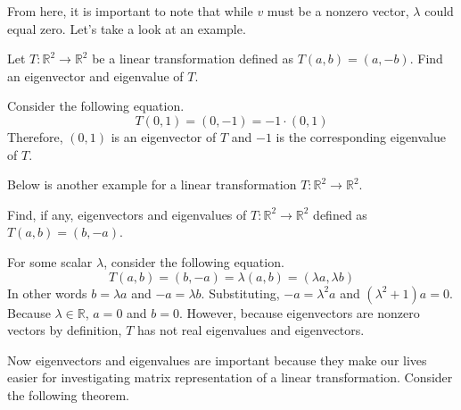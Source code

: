 \documentclass[../main.tex]{subfiles}
\begin{document}
From here, it is important to note that while $v$ must be a
nonzero vector, $\lambda$ could equal zero. Let's take a look
at an example.

\begin{problem}
Let $T: \mathbb{R}^2 \to \mathbb{R}^2$ be a linear transformation
defined as $T(a, b) = (a, - b)$. Find an eigenvector and eigenvalue
of $T$.
\end{problem}
\begin{solution}
Consider the following equation.
\[
T(0, 1) = (0, -1) = -1 \cdot (0, 1)
\]
Therefore, $(0, 1)$ is an eigenvector of $T$ and $-1$ is the
corresponding eigenvalue of $T$.
\end{solution}

Below is another example for a linear transformation $T: \mathbb{R}^2
\to \mathbb{R}^2$.

\begin{problem}
Find, if any, eigenvectors and eigenvalues of $T: \mathbb{R}^2 \to
\mathbb{R}^2$ defined as $T(a, b) = (b, -a)$.
\end{problem}
\begin{solution}
For some scalar $\lambda$, consider the following equation.
\[
T(a, b) = (b, -a) = \lambda (a, b) = (\lambda a, \lambda b)
\]
In other words $b = \lambda a$ and $-a = \lambda b$. Substituting,
$-a = \lambda^2 a$ and $(\lambda^2 + 1) a = 0$. Because $\lambda \in
\mathbb{R}$, $a = 0$ and $b = 0$. However, because eigenvectors
are nonzero vectors by definition, $T$ has not real eigenvalues
and eigenvectors.
\end{solution}

Now eigenvectors and eigenvalues are important because they make
our lives easier for investigating matrix representation of a
linear transformation. Consider the following theorem.
\end{document}
